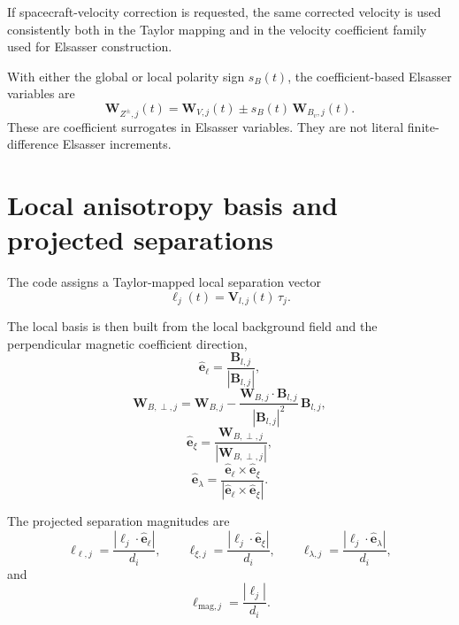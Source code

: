 \documentclass[11pt]{article}
\begin{document}
If spacecraft-velocity correction is requested, the same corrected velocity is used
consistently both in the Taylor mapping and in the velocity coefficient family used
for Elsasser construction.

With either the global or local polarity sign $s_B(t)$, the coefficient-based
Elsasser variables are
\begin{equation}
 \mathbf{W}_{Z^{\pm},j}(t) = \mathbf{W}_{V,j}(t) \pm s_B(t)\,\mathbf{W}_{B_v,j}(t).
\end{equation}
These are coefficient surrogates in Elsasser variables. They are not literal
finite-difference Elsasser increments.

\section{Local anisotropy basis and projected separations}

The code assigns a Taylor-mapped local separation vector
\begin{equation}
 \bm{\ell}_j(t) = \mathbf{V}_{l,j}(t)\,\tau_j.
\end{equation}

The local basis is then built from the local background field and the perpendicular
magnetic coefficient direction,
\begin{equation}
 \hat{\mathbf{e}}_{\ell} = \frac{\mathbf{B}_{l,j}}{|\mathbf{B}_{l,j}|},
\end{equation}
\begin{equation}
 \mathbf{W}_{B,\perp,j} = \mathbf{W}_{B,j} - \frac{\mathbf{W}_{B,j}\cdot \mathbf{B}_{l,j}}{|\mathbf{B}_{l,j}|^2}\,\mathbf{B}_{l,j},
\end{equation}
\begin{equation}
 \hat{\mathbf{e}}_{\xi} = \frac{\mathbf{W}_{B,\perp,j}}{|\mathbf{W}_{B,\perp,j}|},
\end{equation}
\begin{equation}
 \hat{\mathbf{e}}_{\lambda} = \frac{\hat{\mathbf{e}}_{\ell}\times\hat{\mathbf{e}}_{\xi}}{|\hat{\mathbf{e}}_{\ell}\times\hat{\mathbf{e}}_{\xi}|}.
\end{equation}

The projected separation magnitudes are
\begin{equation}
 \ell_{\ell,j} = \frac{|\bm{\ell}_j\cdot\hat{\mathbf{e}}_{\ell}|}{d_i}, \qquad
 \ell_{\xi,j} = \frac{|\bm{\ell}_j\cdot\hat{\mathbf{e}}_{\xi}|}{d_i}, \qquad
 \ell_{\lambda,j} = \frac{|\bm{\ell}_j\cdot\hat{\mathbf{e}}_{\lambda}|}{d_i},
\end{equation}
and
\begin{equation}
 \ell_{\mathrm{mag},j} = \frac{|\bm{\ell}_j|}{d_i}.
\end{equation}
\end{document}
